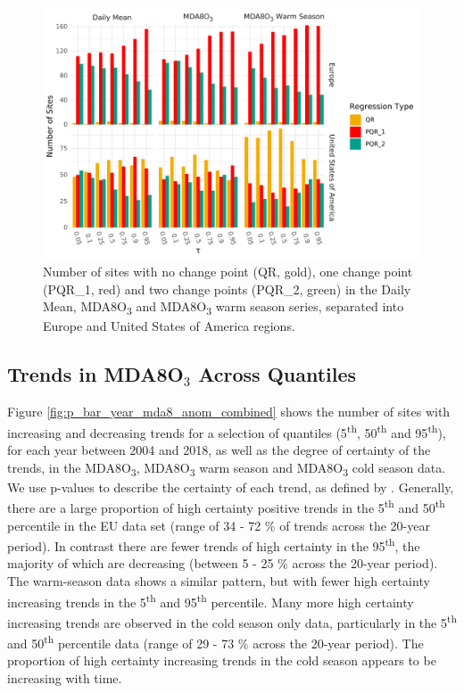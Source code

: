 \documentclass[journal abbreviation, manuscript]{copernicus}
\begin{document}
\begin{figure}[h!]
\includegraphics[width=12cm]{figures/paper_figures/regression_type_bars_o3.pdf}
\caption{Number of sites with no change point (QR, gold), one change point (PQR\_1, red) and two change points (PQR\_2, green) in the Daily Mean, MDA8O\textsubscript{3} and MDA8O\textsubscript{3} warm season series, separated into Europe and United States of America regions.}
\label{fig:regression_type}
\end{figure}




\subsection{Trends in MDA8O$_3$ Across Quantiles} \label{sect:new_mda8_trends}

Figure \ref{fig:p_bar_year_mda8_anom_combined} shows the number of sites with increasing and decreasing trends for a selection of quantiles (5\textsuperscript{th}, 50\textsuperscript{th} and 95\textsuperscript{th}), for each year between 2004 and 2018, as well as the degree of certainty of the trends, in the MDA8O\textsubscript{3}, MDA8O\textsubscript{3} warm season and MDA8O\textsubscript{3} cold season data. We use p-values to describe the certainty of each trend, as defined by \cite{chang2023guidancenotebeststatistical}.
Generally, there are a large proportion of high certainty positive trends in the 5\textsuperscript{th} and 50\textsuperscript{th} percentile in the EU data set (range of 34 - 72 \% of trends across the 20-year period). In contrast there are fewer trends of high certainty in the 95\textsuperscript{th}, the majority of which are decreasing (between 5 - 25 \% across the 20-year period). The warm-season data shows a similar pattern, but with fewer high certainty increasing trends in the 5\textsuperscript{th} and 95\textsuperscript{th} percentile. Many more high certainty increasing trends are observed in the cold season only data, particularly in the 5\textsuperscript{th} and 50\textsuperscript{th} percentile data (range of 29 - 73 \% across the 20-year period). The proportion of high certainty increasing trends in the cold season appears to be increasing with time.
\end{document}
